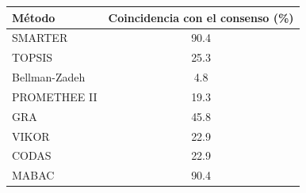 \begin{tabular}{lc}
\hline
\textbf{Método} & \textbf{Coincidencia con el consenso (\%)} \\
\hline
SMARTER & 90.4 \\
TOPSIS & 25.3 \\
Bellman-Zadeh & 4.8 \\
PROMETHEE II & 19.3 \\
GRA & 45.8 \\
VIKOR & 22.9 \\
CODAS & 22.9 \\
MABAC & 90.4 \\
\hline
\end{tabular}
